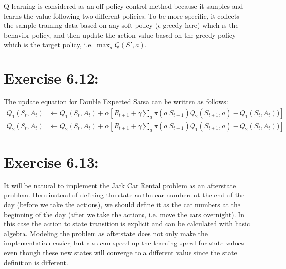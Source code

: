 \documentclass[10pt,letterpaper]{article}
\begin{document}
Q-learning is considered as an off-policy control method because it samples and learns the value following two different policies. To be more specific, it collects the sample training data based on any soft policy ($\epsilon$-greedy here) which is the behavior policy, and then update the action-value based on the greedy policy which is the target policy, i.e. $\max_aQ(S',a)$.


\section*{Exercise 6.12: }
\label{6.12}

The update equation for Double Expected Sarsa can be written as follows:
\begin{align*}
Q_1(S_t, A_t) &\gets Q_1(S_t, A_t) + \alpha[R_{t+1} + \gamma\sum_a\pi(a|S_{t+1})Q_2(S_{t+1}, a) - Q_1(S_t, A_t))]\\
Q_2(S_t, A_t) &\gets Q_2(S_t, A_t) + \alpha[R_{t+1} + \gamma\sum_a\pi(a|S_{t+1})Q_1(S_{t+1}, a) - Q_2(S_t, A_t))]
\end{align*}

\section*{Exercise 6.13: }
\label{6.13}

It will be natural to implement the Jack Car Rental problem as an afterstate problem. Here instead of defining the state as the car numbers at the end of the day (before we take the actions), we should define it as the car numbers at the beginning of the day (after we take the actions, i.e. move the cars overnight). In this case the action to state transition is explicit and can be calculated with basic algebra. Modeling the problem as afterstate does not only make the implementation easier, but also can speed up the learning speed for state values even though these new states will converge to a different value since the state definition is different. 

\clearpage
\end{document}
